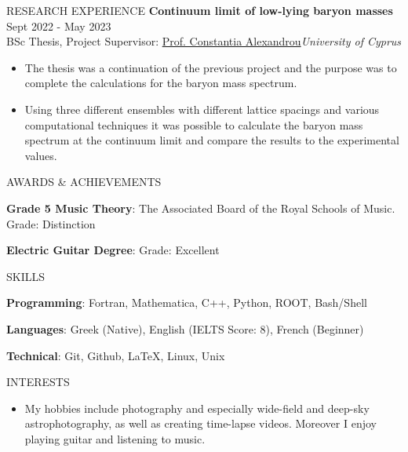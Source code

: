 \documentclass{resume} %
\begin{document}
\begin{rSection}{RESEARCH EXPERIENCE}
\textbf{Continuum limit of low-lying baryon masses} \hfill Sept 2022 - May 2023\\
BSc Thesis, Project Supervisor:  \href{https://www.cyi.ac.cy/index.php/castorc/about-the-center/castorc-our-people/itemlist/user/99-constantia-alexandrou.html}{Prof. Constantia Alexandrou}\hfill \textit{University of Cyprus}
 \begin{itemize}
    \itemsep -3pt {} 
     \item The thesis was a continuation of the previous project and the purpose was to complete the calculations for the baryon mass spectrum.
     \item Using three different ensembles with different lattice spacings and various computational techniques it was possible to calculate the baryon mass spectrum at the continuum limit and compare the results to the experimental values.
 \end{itemize}

\end{rSection} 


\begin{rSection}{AWARDS \& ACHIEVEMENTS}
\vspace{-1.25em}
\item \textbf{Grade 5 Music Theory}: {The Associated Board of the Royal Schools of Music. Grade: Distinction}
\item \textbf{Electric Guitar Degree}: {Grade: Excellent}
\end{rSection} 

\begin{rSection}{SKILLS} 
\item \textbf{Programming}: Fortran, Mathematica, C++, Python, ROOT, Bash/Shell
\item \textbf{Languages}: Greek (Native), English (IELTS Score: 8), French (Beginner)
\item \textbf{Technical}: Git, Github, \LaTeX, Linux, Unix


\end{rSection}

\begin{rSection}{INTERESTS} 
\begin{itemize}
   \item My hobbies include photography and especially wide-field and deep-sky astrophotography, as well as creating time-lapse videos. Moreover I enjoy playing guitar and listening to music. 
\end{itemize}


\end{rSection}
\end{document}
